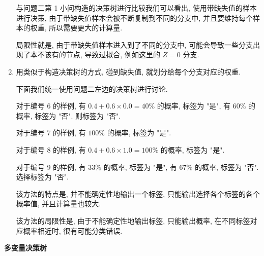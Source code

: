 \documentclass[answers]{exam}  %
\begin{document}
\begin{questions}
\begin{solution}
\begin{enumerate}
            与问题二第 1 小问构造的决策树进行比较我们可以看出, 使用带缺失值的样本进行决策, 由于带缺失值样本会被不断复制到不同的分支中, 并且要维持每个样本的权重, 所以需要更大的计算量.

            局限性就是, 由于带缺失值样本进入到了不同的分支中, 可能会导致一些分支出现了本不该有的节点, 导致过拟合, 例如这里的 $Z = 0$ 分支.

      \item

            用类似于构造决策树的方式, 碰到缺失值, 就划分给每个分支对应的权重.

            下面我们统一使用问题二左边的决策树进行讨论.

            对于编号 6 的样例, 有 $0.4 + 0.6 \times 0.0 = 40\%$ 的概率, 标签为 "是", 有 $60\%$ 的概率, 标签为 "否". 则标签为 "否".

            对于编号 7 的样例, 有 $100\%$ 的概率, 标签为 "是".

            对于编号 8 的样例, 有 $0.4 + 0.6 \times 1.0 = 100\%$ 的概率, 标签为 "是".

            对于编号 9 的样例, 有 $33\%$ 的概率, 标签为 "是", 有 $67\%$ 的概率, 标签为 "否". 选择标签为 "否".

            该方法的特点是, 并不能确定性地输出一个标签, 只能输出选择各个标签的各个概率值, 并且计算量也较大.

            该方法的局限性是, 由于不能确定性地输出标签, 只能输出概率, 在不同标签对应概率相近时, 很有可能分类错误.

    \end{enumerate}
  \end{solution}


  \question [20] \textbf{多变量决策树}


\end{questions}
\end{document}
